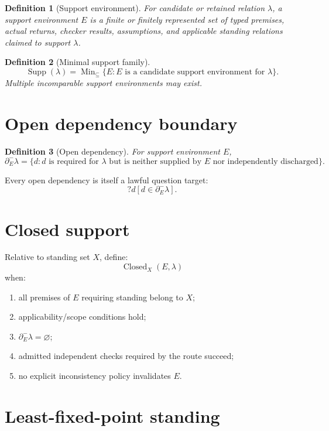 \documentclass[11pt,oneside]{article}
\newtheorem{definition}{Definition}[section]
\newcommand{\Supp}{\operatorname{Supp}}
\newcommand{\Closed}{\operatorname{Closed}}
\begin{document}
\begin{definition}[Support environment]
For candidate or retained relation \(\lambda\), a support environment \(E\) is a finite or finitely represented set of typed premises, actual returns, checker results, assumptions, and applicable standing relations claimed to support \(\lambda\).
\end{definition}

\begin{definition}[Minimal support family]
\[
\boxed{
\Supp(\lambda)
=
\operatorname{Min}_{\subseteq}
\{
E:
E\text{ is a candidate support environment for }\lambda
\}.
}
\]
Multiple incomparable support environments may exist.
\end{definition}

\section{Open dependency boundary}

\begin{definition}[Open dependency]
For support environment \(E\),
\[
\boxed{
\partial^-_E\lambda
=
\{
d:
d\text{ is required for }\lambda
\text{ but is neither supplied by }E
\text{ nor independently discharged}
\}.
}
\]
\end{definition}

Every open dependency is itself a lawful question target:
\[
\boxed{
?d[
d\in\partial^-_E\lambda
].
}
\]

\section{Closed support}

Relative to standing set \(X\), define:
\[
\Closed_X(E,\lambda)
\]
when:
\begin{enumerate}
\item all premises of \(E\) requiring standing belong to \(X\);
\item applicability/scope conditions hold;
\item \(\partial^-_E\lambda=\varnothing\);
\item admitted independent checks required by the route succeed;
\item no explicit inconsistency policy invalidates \(E\).
\end{enumerate}

\section{Least-fixed-point standing}
\end{document}
